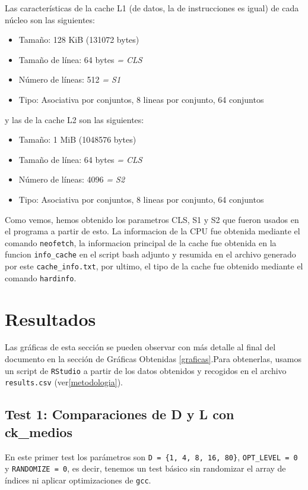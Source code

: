 \documentclass[a4paper,twocolumn]{article}
\begin{document}
    Las características de la cache L1 (de datos, la de instrucciones es igual) de cada núcleo son las siguientes:
    
	\begin{itemize}
        \item Tamaño: 128 KiB (131072 bytes)
        \item Tamaño de línea: 64 bytes \textit{= CLS}
        \item Número de líneas: 512 \textit{= S1}
        \item Tipo: Asociativa por conjuntos, 8 lineas por conjunto, 64 conjuntos
    \end{itemize}
    
    y las de la cache L2 son las siguientes: 
    
	\begin{itemize}
        \item Tamaño: 1 MiB (1048576 bytes)
        \item Tamaño de línea: 64 bytes \textit{= CLS}
        \item Número de líneas: 4096 \textit{= S2}
        \item Tipo: Asociativa por conjuntos, 8 lineas por conjunto, 64 conjuntos
    \end{itemize}
    
    Como vemos, hemos obtenido los parametros CLS, S1 y S2 que fueron usados en el programa a partir de esto. La informacion de la CPU fue obtenida mediante el comando \texttt{neofetch}, la informacion principal de la cache fue obtenida en la funcion \texttt{info\_cache} en el script bash adjunto y resumida en el archivo generado por este \texttt{cache\_info.txt}, por ultimo, el tipo de la cache fue obtenido mediante el comando \texttt{hardinfo}.
    
	\section{Resultados}
	
	Las gráficas de esta sección se pueden observar con más detalle al final del documento en la sección de Gráficas Obtenidas \autoref{graficas}.Para obtenerlas, usamos un script de \texttt{RStudio} a partir de los datos obtenidos y recogidos en el archivo \texttt{results.csv} (ver\autoref{metodologia}). 

	\subsection{Test 1: Comparaciones de D y L con ck\_medios}
	En este primer test los parámetros son \texttt{D = \{1, 4, 8, 16, 80\}}, \texttt{OPT\_LEVEL = 0} y \texttt{RANDOMIZE = 0}, es decir, tenemos un test básico sin randomizar el array de índices ni aplicar optimizaciones de \texttt{gcc}. \\
	
\end{document}
